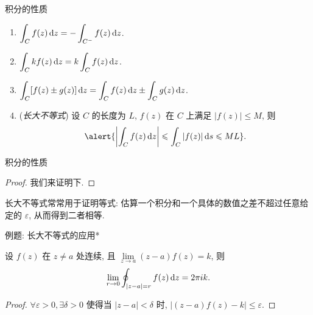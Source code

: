 \begin{frame}{积分的性质}
\onslide<+->
\begin{theorem}
\begin{enumerate}
\item $\displaystyle\int_Cf(z)\,\mathrm{d} z=-\displaystyle\int_{C^-}f(z)\,\mathrm{d} z$.
\item $\displaystyle\int_Ckf(z)\,\mathrm{d} z=k\displaystyle\int_Cf(z)\,\mathrm{d} z$.
\item $\displaystyle\int_C[f(z)\pm g(z)]\,\mathrm{d} z
=\displaystyle\int_Cf(z)\,\mathrm{d} z\pm\displaystyle\int_Cg(z)\,\mathrm{d} z$.
\item (\emph{长大不等式}) 设 $C$ 的长度为 $L$, $f(z)$ 在 $C$ 上满足 $|f(z)|\le M$, 则
\[\alert{\abs{\int_Cf(z)\diff z}\le\int_C|f(z)|\diff s\le ML}.\]
\end{enumerate}
\end{theorem}
\end{frame}


\begin{frame}{积分的性质}
\onslide<+->
\begin{proof}
我们来证明下.
\end{proof}
\onslide<+->
长大不等式常常用于证明等式: 估算一个积分和一个具体的数值之差不超过任意给定的 $\varepsilon$, 从而得到二者相等.
\end{frame}


\begin{frame}{例题: 长大不等式的应用*}
\onslide<+->
\begin{example}
设 $f(z)$ 在 $z\neq a$ 处连续, 且 $\lim\limits_{z\to a}(z-a)f(z)=k$, 则
\vspace{-0.9\baselineskip}
\[\lim
_{r\to0}\oint_{|z-a|=r}f(z)\,\mathrm{d} z=2\pi ik.\]
\end{example}
\onslide<+->
\begin{proof}
$\forall \varepsilon>0,\exists\delta>0$ 使得当 $|z-a|<\delta$ 时, $|(z-a)f(z)-k|\le\varepsilon$.
\end{proof}
\end{frame}

